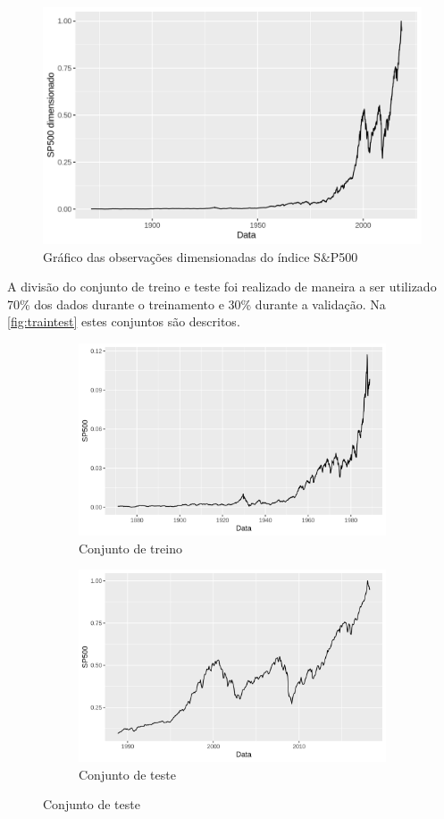 \documentclass[
    12pt,
    oneside,
    a4paper,
    english,
    brazil
]{abntex2}
\begin{document}
\begin{figure}[ht]
    \centering
    \caption{Gráfico das observações dimensionadas do índice S\&P500}\label{fig:sp500}
    \includegraphics[width=.5\linewidth]{images/SP500.png}
\end{figure}

A  divisão do  conjunto  de treino  e  teste  foi realizado  de  maneira a  ser
utilizado 70\% dos  dados durante o treinamento e 30\%  durante a validação. Na
\autoref{fig:traintest} estes conjuntos são descritos.

\begin{figure}[ht]
    \caption{Divisão da série entre os conjuntos de treino e teste}\label{fig:traintest}
    \begin{subfigure}{.5\textwidth}
        \centering
        \includegraphics[width=.8\linewidth]{images/SP500_train.png}
        \caption{Conjunto de treino}
    \end{subfigure}
    \begin{subfigure}{.5\textwidth}
        \centering
        \includegraphics[width=.8\linewidth]{images/SP500_test.png}
        \caption{Conjunto de teste}
    \end{subfigure}
\end{figure}
\end{document}
